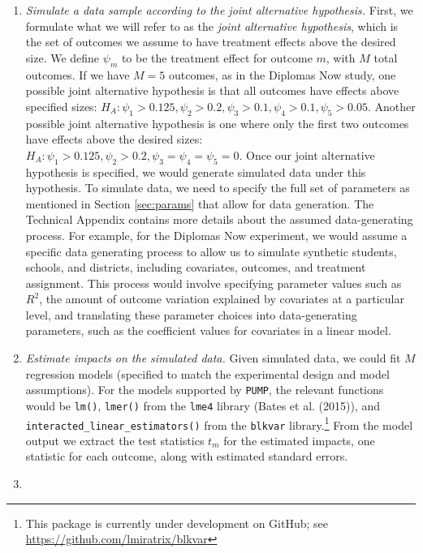 \documentclass{article}
\begin{document}
\begin{enumerate}
\def\labelenumi{\arabic{enumi}.}
\item
  \emph{Simulate a data sample according to the joint alternative
  hypothesis.} First, we formulate what we will refer to as the
  \emph{joint alternative hypothesis}, which is the set of outcomes we
  assume to have treatment effects above the desired size. We define
  \(\psi_m\) to be the treatment effect for outcome \(m\), with \(M\)
  total outcomes. If we have \(M = 5\) outcomes, as in the Diplomas Now
  study, one possible joint alternative hypothesis is that all outcomes
  have effects above specified sizes:
  \(H_A: \psi_1 > 0.125, \psi_2 > 0.2, \psi_3 > 0.1, \psi_4 > 0.1, \psi_5 > 0.05\).
  Another possible joint alternative hypothesis is one where only the
  first two outcomes have effects above the desired sizes:
  \(H_A: \psi_1 > 0.125, \psi_2 > 0.2, \psi_3 = \psi_4 = \psi_5 = 0\).
  Once our joint alternative hypothesis is specified, we would generate
  simulated data under this hypothesis. To simulate data, we need to
  specify the full set of parameters as mentioned in Section
  \ref{sec:params} that allow for data generation. The Technical
  Appendix contains more details about the assumed data-generating
  process. For example, for the Diplomas Now experiment, we would assume
  a specific data generating process to allow us to simulate synthetic
  students, schools, and districts, including covariates, outcomes, and
  treatment assignment. This process would involve specifying parameter
  values such as \(R^2\), the amount of outcome variation explained by
  covariates at a particular level, and translating these parameter
  choices into data-generating parameters, such as the coefficient
  values for covariates in a linear model.
\item
  \emph{Estimate impacts on the simulated data.} Given simulated data,
  we could fit \(M\) regression models (specified to match the
  experimental design and model assumptions). For the models supported
  by \texttt{PUMP}, the relevant functions would be \texttt{lm()},
  \texttt{lmer()} from the \texttt{lme4} library (Bates et al. (2015)),
  and \texttt{interacted\_linear\_estimators()} from the \texttt{blkvar}
  library.\footnote{This package is currently under development on
    GitHub; see \url{https://github.com/lmiratrix/blkvar}} From the
  model output we extract the test statistics \(t_m\) for the estimated
  impacts, one statistic for each outcome, along with estimated standard
  errors.
\item

\end{enumerate}
\end{document}
